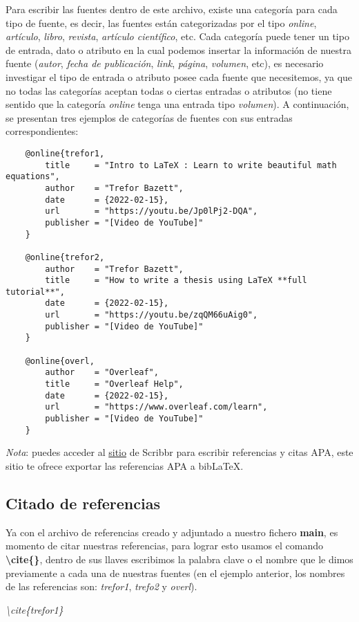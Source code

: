 Para escribir las fuentes dentro de este archivo, existe una categoría para cada tipo de fuente, es decir, las fuentes están categorizadas por el tipo \textit{online}, \textit{artículo}, \textit{libro}, \textit{revista}, \textit{artículo científico}, etc. Cada categoría puede tener un tipo de entrada, dato o atributo en la cual podemos insertar la información de nuestra fuente (\textit{autor}, \textit{fecha de publicación}, \textit{link}, \textit{página}, \textit{volumen}, etc), es necesario investigar el tipo de entrada o atributo posee cada fuente que necesitemos, ya que no todas las categorías aceptan todas o ciertas entradas o atributos (no tiene sentido que la categoría \textit{online} tenga una entrada tipo \textit{volumen}). A continuación, se presentan tres ejemplos de categorías de fuentes con sus entradas correspondientes:
\begin{lstlisting}
    @online{trefor1,
        title     = "Intro to LaTeX : Learn to write beautiful math equations",
        author    = "Trefor Bazett",
        date      = {2022-02-15},
        url       = "https://youtu.be/Jp0lPj2-DQA",
        publisher = "[Video de YouTube]"
    }

    @online{trefor2,
        author    = "Trefor Bazett",
        title     = "How to write a thesis using LaTeX **full tutorial**",
        date      = {2022-02-15},
        url       = "https://youtu.be/zqQM66uAig0",
        publisher = "[Video de YouTube]"
    }

    @online{overl,
        author    = "Overleaf",
        title     = "Overleaf Help",
        date      = {2022-02-15},
        url       = "https://www.overleaf.com/learn",
        publisher = "[Video de YouTube]"
    }
\end{lstlisting}

\textit{Nota}: puedes acceder al \href{https://www.scribbr.es/}{sitio} de Scribbr para escribir referencias y citas APA, este sitio te ofrece exportar las referencias APA a bibLaTeX.


\subsection{Citado de referencias}

Ya con el archivo de referencias creado y adjuntado a nuestro fichero \textbf{main}, es momento de citar nuestras referencias, para lograr esto usamos el comando \textbf{\textbackslash{cite\{\}}}, dentro de sus llaves escribimos la palabra clave o el nombre que le dimos previamente a cada una de nuestras fuentes (en el ejemplo anterior, los nombres de las referencias son: \textit{trefor1}, \textit{trefo2} y \textit{overl}).
\begin{center}
    \textit{\textbackslash{cite\{trefor1\}}}
\end{center}


